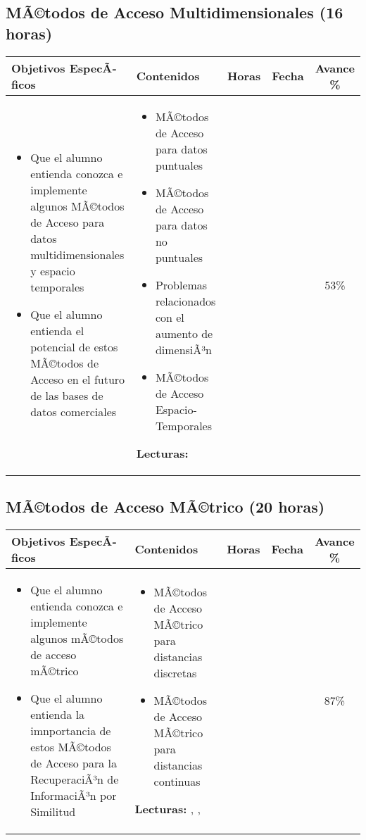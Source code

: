 \documentclass[a4paper]{article}
\newenvironment{unitgoals}
{ \begin{itemize} }
{ \end{itemize}   }
\newenvironment{topics}
{ \begin{itemize} }
{ \end{itemize}   }
\begin{document}
\subsection{MÃ©todos de Acceso Multidimensionales (16 horas)}
\begin{tabularx}{\textwidth}{|X|X|c|c|c|}
\hline
\textbf{Objetivos EspecÃ­ficos} &   \textbf{Contenidos} & \textbf{Horas} & \textbf{Fecha} & \textbf{Avance \%}  \\ \hline
\begin{unitgoals}
         \item Que el alumno entienda conozca e implemente algunos MÃ©todos de Acceso para datos multidimensionales y espacio temporales
         \item Que el alumno entienda el potencial de estos MÃ©todos de Acceso en el futuro de las bases de datos comerciales
   \end{unitgoals}      &
\begin{topics}
         \item MÃ©todos de Acceso para datos puntuales
         \item MÃ©todos de Acceso para datos no puntuales
         \item Problemas relacionados con el aumento de dimensiÃ³n
         \item MÃ©todos de Acceso Espacio-Temporales
   \end{topics}
{\bf Lecturas:} \cite{Gaede98multidimensional} &
&
&
53\%
\\
\hline
\end{tabularx}

\subsection{MÃ©todos de Acceso MÃ©trico (20 horas)}
\begin{tabularx}{\textwidth}{|X|X|c|c|c|}
\hline
\textbf{Objetivos EspecÃ­ficos} &   \textbf{Contenidos} & \textbf{Horas} & \textbf{Fecha} & \textbf{Avance \%}  \\ \hline
\begin{unitgoals}
         \item Que el alumno entienda conozca e implemente algunos mÃ©todos de acceso mÃ©trico
         \item Que el alumno entienda la imnportancia de estos MÃ©todos de Acceso para la RecuperaciÃ³n de InformaciÃ³n por Similitud
   \end{unitgoals}      &
\begin{topics}
         \item MÃ©todos de Acceso MÃ©trico para distancias discretas
         \item MÃ©todos de Acceso MÃ©trico para distancias continuas
   \end{topics}
{\bf Lecturas:} \cite{Chavez:01}, \cite{Traina00SlimTree}, \cite{Zezula07} &
&
&
87\%
\\
\hline
\end{tabularx}
\end{document}
